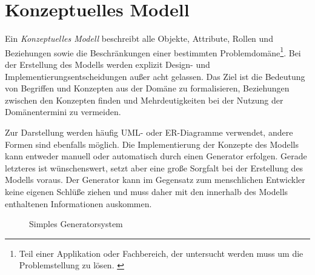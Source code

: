 \section{Konzeptuelles Modell}

\begin{thesisDefinition}
Ein \emph{Konzeptuelles Modell} beschreibt alle Objekte, Attribute, Rollen und Beziehungen sowie die Beschränkungen einer bestimmten Problemdomäne\footnote{Teil einer Applikation oder Fachbereich, der untersucht werden muss um die Problemstellung zu lösen. \cite{wiki:problemdomain}}.
Bei der Erstellung des Modells werden explizit Design- und Implementierungsentscheidungen außer acht gelassen. 
Das Ziel ist die Bedeutung von Begriffen und Konzepten aus der Domäne zu formalisieren, Beziehungen zwischen den Konzepten finden und Mehrdeutigkeiten bei der Nutzung der Domänentermini zu vermeiden.
\end{thesisDefinition}

Zur Darstellung werden häufig UML- oder ER-Diagramme verwendet, andere Formen sind ebenfalls möglich.
Die Implementierung der Konzepte des Modells kann entweder manuell oder automatisch durch einen Generator erfolgen. Gerade letzteres ist wünschenswert, setzt aber eine große Sorgfalt bei der Erstellung des Modells voraus. Der Generator kann im Gegensatz zum menschlichen Entwickler keine eigenen Schlüße ziehen und muss daher mit den innerhalb des Modells enthaltenen Informationen auskommen.


\begin{figure}[tb]
    \centering
    \caption{Simples Generatorsystem}
    \label{fig:generatorsystem}
\end{figure}
